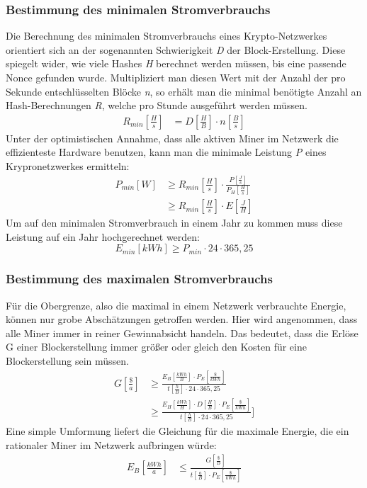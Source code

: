 \documentclass[12pt]{article}
\begin{document}
\subsubsection{Bestimmung des minimalen Stromverbrauchs}
Die Berechnung des minimalen Stromverbrauchs eines Krypto-Netzwerkes orientiert sich an der sogenannten Schwierigkeit \textit{D} der Block-Erstellung. Diese spiegelt wider, wie viele Hashes \textit{H} berechnet werden müssen, bis eine passende Nonce gefunden wurde. Multipliziert man diesen Wert mit der Anzahl der pro Sekunde entschlüsselten Blöcke \textit{n}, so erhält man die minimal benötigte Anzahl an Hash-Berechnungen \textit{R}, welche pro Stunde ausgeführt werden müssen.
\begin{align}
    R_{min}\left[\frac{H}{s}\right]&=D\left[\frac{H}{B}\right]\cdot n\left[\frac{B}{s}\right]
\end{align}
\clearpage
\noindent Unter der optimistischen Annahme, dass alle aktiven Miner im Netzwerk die effizienteste Hardware benutzen, kann man die minimale Leistung \textit{P} eines Krypronetzwerkes ermitteln:
\begin{align*}
    P_{min} [W]&\geq R_{min}\left[\frac{H}{s}\right]\cdot \frac{P\left[\frac{J}{s}\right]}{P_H\left[\frac{H}{s}\right]}\\
    &\geq R_{min}\left[\frac{H}{s}\right]\cdot E\left[\frac{J}{H}\right]
\end{align*}
Um auf den minimalen Stromverbrauch in einem Jahr zu kommen muss diese Leistung auf ein Jahr hochgerechnet werden:
\[ E_{min} [kWh] \geq P_{min}\cdot 24\cdot 365,25\]

\subsubsection{Bestimmung des maximalen Stromverbrauchs}
Für die Obergrenze, also die maximal in einem Netzwerk verbrauchte Energie, können nur grobe Abschätzungen getroffen werden. Hier wird angenommen, dass alle Miner immer in reiner Gewinnabsicht handeln. Das bedeutet, dass die Erlöse G einer Blockerstellung immer größer oder gleich den Kosten für eine Blockerstellung sein müssen.
\begin{align*}
    G\left[\frac{\$}{a}\right]&\geq \frac{E_B\left[\frac{kWh}{B}\right]\cdot P_E\left[\frac{\$}{kWh}\right]}{t \left[\frac{h}{B}\right]\cdot 24\cdot 365,25}\\
    &\geq \frac{E_H\left[\frac{kWh}{H}\right]\cdot D\left[\frac{H}{B}\right]\cdot P_E\left[\frac{\$}{kWh}\right]}{t \left[\frac{h}{B}\right]\cdot 24\cdot 365,25}]
\end{align*}
Eine simple Umformung liefert die Gleichung für die maximale Energie, die ein rationaler Miner im Netzwerk aufbringen würde:
\begin{align*}
    E_B\left[\frac{kWh}{a}\right]&\leq\frac{G\left[\frac{\$}{B}\right]}{t \left[\frac{a}{B}\right]\cdot P_E\left[\frac{\$}{kWh}\right]}
\end{align*}
\end{document}
